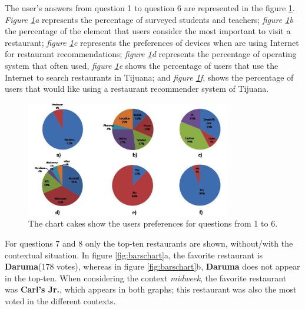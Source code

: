 The user's answers from question 1 to question 6 are represented in
the figure \ref{fig:cakeschart}. \textit{Figure \ref{fig:cakeschart}a}
represents the percentage of surveyed students and teachers;
\textit{figure \ref{fig:cakeschart}b}  the percentage of the element
that users consider the most important to visit a restaurant;
\textit{figure \ref{fig:cakeschart}c} represents the preferences of
devices when are using Internet for restaurant recommendations;
\textit{figure \ref{fig:cakeschart}d} represents the percentage of
operating system that often used, \textit{figure
\ref{fig:cakeschart}e} shows the percentage of users that use the
Internet to search restaurants in Tijuana; and \textit{figure
\ref{fig:cakeschart}f}, shows the percentage of users that would like
using a restaurant recommender system of Tijuana.
\begin{figure}
\captionsetup{justification=centering,margin=2cm,font=footnotesize}
\centering
\setlength\fboxsep{0pt}
\includegraphics[width=0.8\textwidth]{img/cakes.png}
\caption{The chart cakes show the users preferences for questions from 1 to 6.}
\label{fig:cakeschart}     
\end{figure}
For questions 7 and 8 only the top-ten restaurants are shown,
without/with the contextual situation. In figure \ref{fig:barschart}a,
the favorite restaurant is \textbf{Daruma}(178 votes),  whereas in
figure \ref{fig:barschart}b, \textbf{Daruma} does not appear in the
top-ten. When considering the context \textit{midweek}, the favorite
restaurant was \textbf{Carl's Jr.}, which appears in both graphs; this
restaurant was also the most voted in the different contexts.
